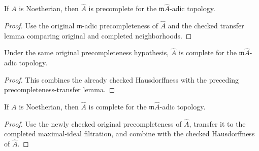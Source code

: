 \begin{lemma}
  \label{lem:adic_completion_power_image_one_is_precomplete_source}
  If \(A\) is Noetherian, then \(\widehat A\) is precomplete for the
  \(\mathfrak m\widehat A\)-adic topology.
\end{lemma}

\begin{proof}
  Use the original \(\mathfrak m\)-adic precompleteness of \(\widehat A\) and
  the checked transfer lemma comparing original and completed neighborhoods.
\end{proof}

\begin{lemma}
  \label{lem:adic_completion_power_image_one_is_adic_complete_of_original_precomplete}
  Under the same original precompleteness hypothesis, \(\widehat A\) is
  complete for the \(\mathfrak m\widehat A\)-adic topology.
\end{lemma}

\begin{proof}
  This combines the already checked Hausdorffness with the preceding
  precompleteness-transfer lemma.
\end{proof}

\begin{lemma}
  \label{lem:adic_completion_power_image_one_is_adic_complete_source}
  If \(A\) is Noetherian, then \(\widehat A\) is complete for the
  \(\mathfrak m\widehat A\)-adic topology.
\end{lemma}

\begin{proof}
  Use the newly checked original precompleteness of \(\widehat A\), transfer
  it to the completed maximal-ideal filtration, and combine with the checked
  Hausdorffness of \(\widehat A\).
\end{proof}

